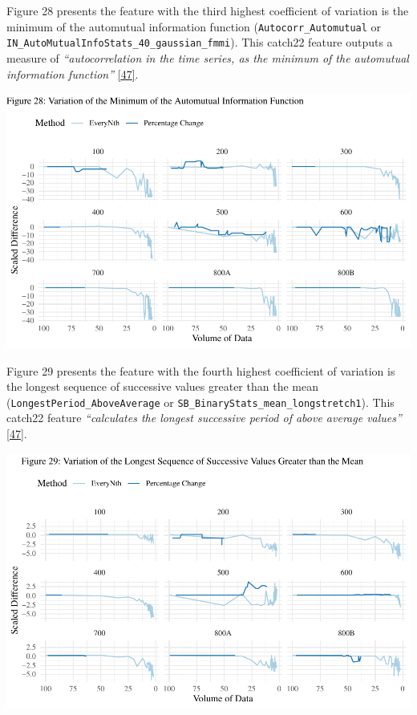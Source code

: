 \documentclass{article}
\begin{document}
Figure 28 presents the feature with the third highest coefficient of
variation is the minimum of the automutual information function
(\texttt{Autocorr\_Automutual} or
\texttt{IN\_AutoMutualInfoStats\_40\_gaussian\_fmmi}). This catch22
feature outputs a measure of \emph{``autocorrelation in the time series,
as the minimum of the automutual information function''}
\protect\hyperlink{ref-feature_book}{{[}47{]}}.

\includegraphics{210431461_CSC8639_Dissertation_files/figure-latex/AutoMutalFunction-1.pdf}

Figure 29 presents the feature with the fourth highest coefficient of
variation is the longest sequence of successive values greater than the
mean (\texttt{LongestPeriod\_AboveAverage} or
\texttt{SB\_BinaryStats\_mean\_longstretch1}). This catch22 feature
\emph{``calculates the longest successive period of above average
values''} \protect\hyperlink{ref-feature_book}{{[}47{]}}.

\includegraphics{210431461_CSC8639_Dissertation_files/figure-latex/LongestGreater-1.pdf}
\end{document}
